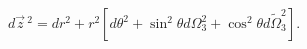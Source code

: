 \begin{equation}
d\vec z\,^2=dr^2+r^2[d\theta^2+\sin^2\theta d\Omega_3^2+\cos^2\theta
d\widetilde\Omega_3^2].
\end{equation}

